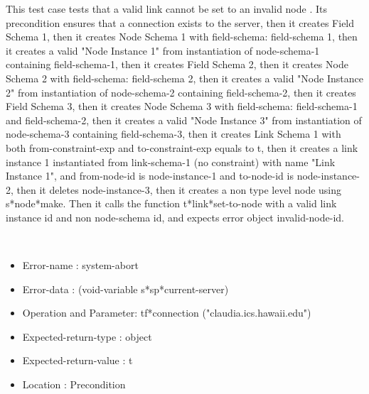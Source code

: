 This test case tests that a valid link cannot be set to an invalid node .
Its precondition ensures that a connection exists to the server, then it creates Field Schema 1, then it creates Node Schema 1 with field-schema: field-schema 1, then it creates a valid "Node Instance 1" from instantiation of node-schema-1 containing field-schema-1, then it creates Field Schema 2, then it creates Node Schema 2 with field-schema: field-schema 2, then it creates a valid "Node Instance 2" from instantiation of node-schema-2 containing field-schema-2, then it creates Field Schema 3, then it creates Node Schema 3 with field-schema: field-schema-1 and field-schema-2, then it creates a valid "Node Instance 3" from instantiation of node-schema-3 containing field-schema-3, then it creates Link Schema 1 with both from-constraint-exp and to-constraint-exp equals to t, then it creates a link instance 1 instantiated from  link-schema-1 (no constraint) with name "Link Instance 1", and from-node-id is node-instance-1 and to-node-id is node-instance-2, then it deletes node-instance-3, then it creates a non type level node using s*node*make.
Then it calls the function t*link*set-to-node  with a valid link instance id and non node-schema id, and expects error object invalid-node-id.



\
\begin {itemize}
\item 	Error-name             : system-abort
\item Error-data             : (void-variable s*sp*current-server)
\item Operation and Parameter: tf*connection ("claudia.ics.hawaii.edu")
\item Expected-return-type   : object
\item Expected-return-value  : t
\item Location               : Precondition
\end {itemize}

